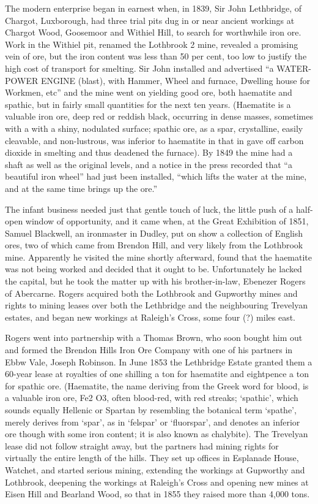 \documentclass[10pt,a4paper]{article}
\begin{document}
The modern enterprise began in earnest when, in 1839, Sir John Lethbridge, of Chargot, Luxborough, had three trial pits dug in or near ancient workings  at Chargot Wood, Goosemoor and Withiel Hill, to search for worthwhile iron ore. Work in the  Withiel pit, renamed the Lothbrook 2 mine, revealed a promising vein of ore, but the iron content was  less than 50 per cent, too low to justify the high cost of transport for smelting. Sir John installed and advertised “a WATER-POWER ENGINE (blast), with Hammer, Wheel and furnace, Dwelling house for Workmen, etc” and the mine went on yielding good ore, both haematite and spathic,  but in fairly small quantities for the next ten years. (Haematite is a valuable iron ore, deep red or reddish black, occurring in dense masses, sometimes with a with a shiny, nodulated surface; spathic ore, as a spar, crystalline, easily cleavable, and non-lustrous, was inferior to haematite in that in gave off carbon dioxide in smelting and thus deadened the furnace). By 1849 the mine had a shaft as well as the original levels, and a notice in the press recorded that “a beautiful iron wheel” had just been installed, “which lifts the water at the mine, and at the same time brings up the ore.”

The infant business needed just that gentle touch of luck, the little push of a half-open window of opportunity, and it came when, at the Great Exhibition of 1851, Samuel Blackwell, an ironmaster in Dudley, put on show a collection of English ores, two of which came from Brendon Hill, and very likely from the Lothbrook mine. Apparently he visited the mine shortly afterward, found that the haematite was not being worked and decided that it ought to be. Unfortunately he lacked the capital, but he took the matter up with his brother-in-law, Ebenezer Rogers of Abercarne. Rogers acquired both the Lothbrook and Gupworthy mines and rights to mining leases over both the Lethbridge and the neighbouring Trevelyan estates, and began new workings at Raleigh’s Cross, some four (?) miles east.

Rogers went into partnership with a Thomas Brown, who soon bought him out and formed the Brendon Hills Iron Ore Company with one of his partners in Ebbw Vale, Joseph Robinson. In June 1853 the Lethbridge Estate granted them a 60-year lease at royalties of one shilling a ton for haematite and eightpence a ton for spathic ore. (Haematite, the name deriving from the Greek word for blood, is a valuable iron ore, Fe2 O3, often blood-red, with red streaks;  ‘spathic’, which sounds equally Hellenic or Spartan by resembling the botanical term ‘spathe’,   merely derives from ‘spar’, as in ‘felspar’ or ‘fluorspar’, and denotes an inferior ore though with some iron content; it is also known as chalybite). The Trevelyan lease did not follow straight away, but the partners had mining rights for virtually the entire length of the hills. They set up offices in Esplanade House, Watchet, and started serious mining, extending the workings at Gupworthy and Lothbrook, deepening the workings at Raleigh’s Cross and opening new mines at Eisen Hill and Bearland Wood, so that in 1855 they raised more than 4,000 tons.
\end{document}
